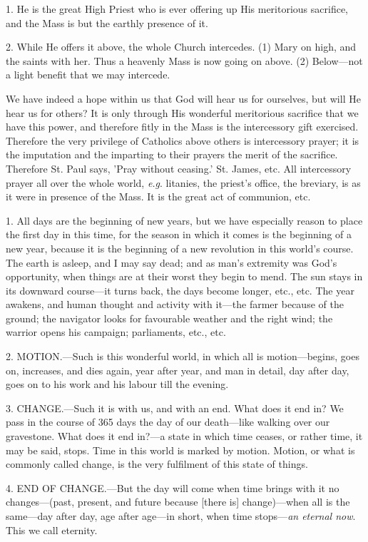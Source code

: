 1. He is the great High Priest who is ever
offering up His meritorious sacrifice, and the Mass is but the earthly
presence of it.

2. While He offers it above, the whole Church
intercedes. (1) Mary on high, and the saints with her. Thus a heavenly
Mass is now going on above. (2) Below—not a light benefit that we
may intercede.

We have indeed a hope within us that God will
hear us for ourselves, but will He hear us for others? It is only
through His wonderful meritorious sacrifice that we have this power,
and therefore fitly in the Mass is the intercessory gift exercised.
Therefore the very privilege of Catholics above others is intercessory
prayer; it is the imputation and the imparting to their prayers the
merit of the sacrifice. Therefore St. Paul says, 'Pray without
ceasing.' St. James, etc. All intercessory prayer all over the whole
world, \emph{e.g}. litanies, the priest's office, the breviary,
is as it were in presence of the Mass. It is the great act of
communion, etc.


1. All days are the beginning of new years, but
we have especially reason to place the first day in this time, for the
season in which it comes is the beginning of a new year, because it is
the beginning of a new revolution in this world's course. The earth is
asleep, and I may say dead; and as man's extremity was God's
opportunity, when things are at their worst they begin to mend. The
sun stays in its downward course—it turns back, the days become
longer, etc., etc. The year awakens, and human thought and activity
with it—the farmer because of the ground; the navigator looks for
favourable weather and the right wind; the warrior opens his campaign;
parliaments, etc., etc.

2. MOTION.—Such
is this wonderful world, in which all is motion—begins, goes on,
increases, and dies again, year after year, and man in detail, day
after day, goes on to his work and his labour till the evening.

3. CHANGE.—Such
it is with us, and with an end. What does it end in? We pass in the
course of 365 days the day of our death—like walking over our
gravestone. What does it end in?—a state in which time ceases, or
rather time, it may be said, stops. Time in this world is marked by
motion. Motion, or what is commonly called change, is the very
fulfilment of this state of things.

4. END OF
CHANGE.—But the day will come
when time brings with it no changes—(past, present, and future
because [there is] change)—when all is the same—day after day, age
after age—in short, when time stops—\emph{an eternal now}. This we
call eternity.


